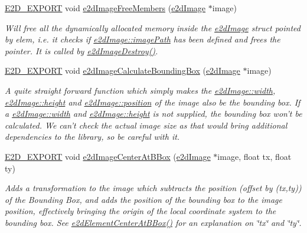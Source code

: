 \begin{DoxyCompactItemize}
\hyperlink{Ez2DS_8h_a9f14e9cb869e1a85fdaba03afcca0df9}{E2\-D\-\_\-\-E\-X\-P\-O\-R\-T} void \hyperlink{group__e2dImage_gadc2770640a66380dabbb5c6399f4e7db}{e2d\-Image\-Free\-Members} (\hyperlink{structe2dImage}{e2d\-Image} $\ast$image)
\begin{DoxyCompactList}\small\item\em Will free all the dynamically allocated memory inside the \hyperlink{structe2dImage}{e2d\-Image} struct pointed by elem, i.\-e. it checks if \hyperlink{structe2dImage_afb14ab23ba86115c3b01ad4122943f89}{e2d\-Image\-::image\-Path} has been defined and frees the pointer. It is called by \hyperlink{group__e2dImage_ga0cf5299cb1479f855966613374a7968a}{e2d\-Image\-Destroy()}. \end{DoxyCompactList}\item 
\hyperlink{Ez2DS_8h_a9f14e9cb869e1a85fdaba03afcca0df9}{E2\-D\-\_\-\-E\-X\-P\-O\-R\-T} void \hyperlink{group__e2dImage_ga3d4d1b561c5283284969e2f66f2799f7}{e2d\-Image\-Calculate\-Bounding\-Box} (\hyperlink{structe2dImage}{e2d\-Image} $\ast$image)
\begin{DoxyCompactList}\small\item\em A quite straight forward function which simply makes the \hyperlink{structe2dImage_ae426f00e82704fa09578f5446e22d915}{e2d\-Image\-::width}, \hyperlink{structe2dImage_a48083b65ac9a863566dc3e3fff09a5b4}{e2d\-Image\-::height} and \hyperlink{structe2dImage_afa8983f25fd6aa6aca18feb07d8d2249}{e2d\-Image\-::position} of the image also be the bounding box. If a \hyperlink{structe2dImage_ae426f00e82704fa09578f5446e22d915}{e2d\-Image\-::width} and \hyperlink{structe2dImage_a48083b65ac9a863566dc3e3fff09a5b4}{e2d\-Image\-::height} is not supplied, the bounding box won't be calculated. We can't check the actual image size as that would bring additional dependencies to the library, so be careful with it. \end{DoxyCompactList}\item 
\hyperlink{Ez2DS_8h_a9f14e9cb869e1a85fdaba03afcca0df9}{E2\-D\-\_\-\-E\-X\-P\-O\-R\-T} void \hyperlink{group__e2dImage_ga67e9b08dc9eb45b38af991d4d739a860}{e2d\-Image\-Center\-At\-B\-Box} (\hyperlink{structe2dImage}{e2d\-Image} $\ast$image, float tx, float ty)
\begin{DoxyCompactList}\small\item\em Adds a transformation to the image which subtracts the position (offset by (tx,ty)) of the Bounding Box, and adds the position of the bounding box to the image position, effectively bringing the origin of the local coordinate system to the bounding box. See \hyperlink{group__e2dElement_gab829b280fa22a3509c40425fc84b5061}{e2d\-Element\-Center\-At\-B\-Box()} for an explanation on \char`\"{}tx\char`\"{} and \char`\"{}ty\char`\"{}. \end{DoxyCompactList}\end{DoxyCompactItemize}


